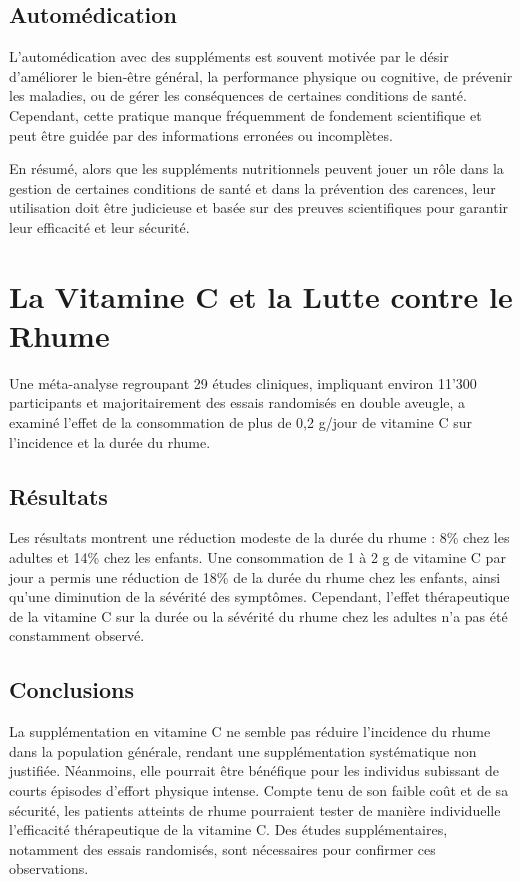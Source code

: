 \documentclass[11pt]{article}
\begin{document}
\subsection{Automédication}
L'automédication avec des suppléments est souvent motivée par le désir d'améliorer le bien-être général, la performance physique ou cognitive, de prévenir les maladies, ou de gérer les conséquences de certaines conditions de santé. Cependant, cette pratique manque fréquemment de fondement scientifique et peut être guidée par des informations erronées ou incomplètes.

En résumé, alors que les suppléments nutritionnels peuvent jouer un rôle dans la gestion de certaines conditions de santé et dans la prévention des carences, leur utilisation doit être judicieuse et basée sur des preuves scientifiques pour garantir leur efficacité et leur sécurité.

\section{La Vitamine C et la Lutte contre le Rhume}

Une méta-analyse regroupant 29 études cliniques, impliquant environ 11'300 participants et majoritairement des essais randomisés en double aveugle, a examiné l'effet de la consommation de plus de 0,2 g/jour de vitamine C sur l'incidence et la durée du rhume.

\subsection{Résultats}
Les résultats montrent une réduction modeste de la durée du rhume : 8\% chez les adultes et 14\% chez les enfants. Une consommation de 1 à 2 g de vitamine C par jour a permis une réduction de 18\% de la durée du rhume chez les enfants, ainsi qu'une diminution de la sévérité des symptômes. Cependant, l'effet thérapeutique de la vitamine C sur la durée ou la sévérité du rhume chez les adultes n'a pas été constamment observé.

\subsection{Conclusions}
La supplémentation en vitamine C ne semble pas réduire l'incidence du rhume dans la population générale, rendant une supplémentation systématique non justifiée. Néanmoins, elle pourrait être bénéfique pour les individus subissant de courts épisodes d'effort physique intense. Compte tenu de son faible coût et de sa sécurité, les patients atteints de rhume pourraient tester de manière individuelle l'efficacité thérapeutique de la vitamine C. Des études supplémentaires, notamment des essais randomisés, sont nécessaires pour confirmer ces observations.
\end{document}
